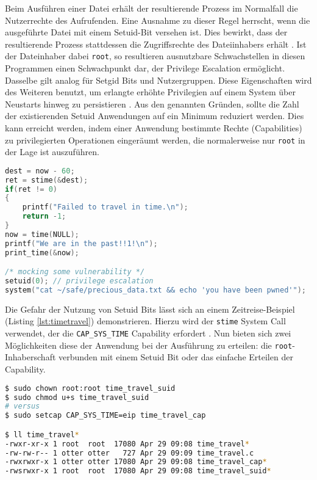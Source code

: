 Beim Ausführen einer Datei erhält der resultierende Prozess im Normalfall die Nutzerrechte des Aufrufenden. Eine Ausnahme zu dieser Regel herrscht, wenn die ausgeführte Datei mit einem Setuid-Bit versehen ist. Dies bewirkt, dass der resultierende Prozess stattdessen die Zugriffsrechte des Dateiinhabers erhält \cite{man-chmod}. Ist der Dateinhaber dabei \texttt{root}, so resultieren ausnutzbare Schwachstellen in diesen Programmen einen Schwachpunkt dar, der Privilege Escalation ermöglicht. Dasselbe gilt analog für Setgid
Bits und Nutzergruppen. Diese Eigenschaften wird des Weiteren benutzt, um erlangte erhöhte Privilegien auf einem System über Neustarts hinweg zu persistieren \cite{attack-setuid}. Aus den genannten Gründen, sollte die Zahl der existierenden Setuid Anwendungen auf ein Minimum reduziert werden. Dies kann erreicht werden, indem einer Anwendung bestimmte Rechte (Capabilities) zu privilegierten Operationen eingeräumt werden, die normalerweise nur \texttt{root} in der Lage ist
auszuführen. 

\begin{lstlisting}[language=c,label=lst:timetravel]
dest = now - 60;
ret = stime(&dest);
if(ret != 0)
{
    printf("Failed to travel in time.\n");
    return -1;
}
now = time(NULL);
printf("We are in the past!!1!\n");
print_time(&now);

/* mocking some vulnerability */
setuid(0); // privilege escalation
system("cat ~/safe/precious_data.txt && echo 'you have been pwned'");
\end{lstlisting}

Die Gefahr der Nutzung von Setuid Bits lässt sich an einem Zeitreise-Beispiel (Listing \ref{lst:timetravel}) demonstrieren. Hierzu wird der \texttt{stime} System Call verwendet, der die \texttt{CAP\_SYS\_TIME} Capability erfordert \cite{man-capabilities}. Nun bieten sich zwei Möglichkeiten diese der Anwendung bei der Ausführung zu erteilen: die \texttt{root}-Inhaberschaft verbunden mit einem Setuid Bit oder das einfache Erteilen der Capability.


\begin{lstlisting}[language=bash,label={lst:timetravel}]
$ sudo chown root:root time_travel_suid
$ sudo chmod u+s time_travel_suid 
# versus
$ sudo setcap CAP_SYS_TIME=eip time_travel_cap

$ ll time_travel*
-rwxr-xr-x 1 root  root  17080 Apr 29 09:08 time_travel*
-rw-rw-r-- 1 otter otter   727 Apr 29 09:09 time_travel.c
-rwxrwxr-x 1 otter otter 17080 Apr 29 09:08 time_travel_cap*
-rwsrwxr-x 1 root  root  17080 Apr 29 09:08 time_travel_suid*
\end{lstlisting}


